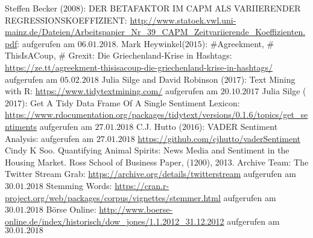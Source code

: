 
	\newpage
	\begin{thebibliography}{12345678}	
	 Steffen Becker ($2008$): DER BETAFAKTOR IM CAPM ALS VARIIERENDER REGRESSIONSKOEFFIZIENT: \url{http://www.statoek.vwl.uni-mainz.de/Dateien/Arbeitspapier_Nr_39_CAPM_Zeitvariierende_Koeffizienten.pdf}: aufgerufen am $06.01.2018$.
	 Mark Heywinkel($2015$): \#Agreekment, \# ThisIsACoup, \# Grexit: Die Griechenland-Krise in Hashtags: \url{https://ze.tt/agreekment-thisisacoup-die-griechenland-krise-in-hashtags/}
	aufgerufen am $05.02.2018$ 
	 Julia Silge and David Robinson ($2017$):  Text Mining with R: \url{https://www.tidytextmining.com/} aufgerufen am $20.10.2017$ 
	 Julia Silge ($2017$): Get A Tidy Data Frame Of A Single Sentiment Lexicon: \url{https://www.rdocumentation.org/packages/tidytext/versions/0.1.6/topics/get_sentiments} aufgerufen am $27.01.2018$ 
	 C.J. Hutto ($2016$): VADER Sentiment Analysis: aufgerufen am $27.01.2018$ \url{https://github.com/cjhutto/vaderSentiment}
	 Cindy K Soo. Quantifying Animal Spirits: News Media and Sentiment in the Housing Market. Ross School of Business Paper, (1200), 2013.
	Archive Team: The Twitter Stream Grab:
	 \url{https://archive.org/details/twitterstream} aufgerufen am $30.01.2018$
	 Stemming Words: \url{https://cran.r-project.org/web/packages/corpus/vignettes/stemmer.html} aufgerufen am $30.01.2018$
	 Börse Online: \url{http://www.boerse-online.de/index/historisch/dow_jones/1.1.2012_31.12.2012} aufgerufen am $30.01.2018$
\end{thebibliography}
\clearpage